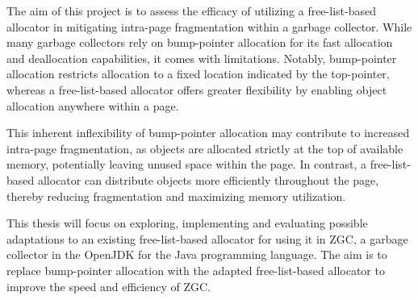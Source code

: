 
The aim of this project is to assess the efficacy of utilizing a free-list-based allocator in mitigating intra-page fragmentation within a garbage collector. While many garbage collectors rely on bump-pointer allocation for its fast allocation and deallocation capabilities, it comes with limitations. Notably, bump-pointer allocation restricts allocation to a fixed location indicated by the top-pointer, whereas a free-list-based allocator offers greater flexibility by enabling object allocation anywhere within a page.

This inherent inflexibility of bump-pointer allocation may contribute to increased intra-page fragmentation, as objects are allocated strictly at the top of available memory, potentially leaving unused space within the page. In contrast, a free-list-based allocator can distribute objects more efficiently throughout the page, thereby reducing fragmentation and maximizing memory utilization.

This thesis will focus on exploring, implementing and evaluating possible adaptations to an existing free-list-based allocator for using it in ZGC, a garbage collector in the OpenJDK for the Java programming language. The aim is to replace bump-pointer allocation with the adapted free-list-based allocator to improve the speed and efficiency of ZGC.


